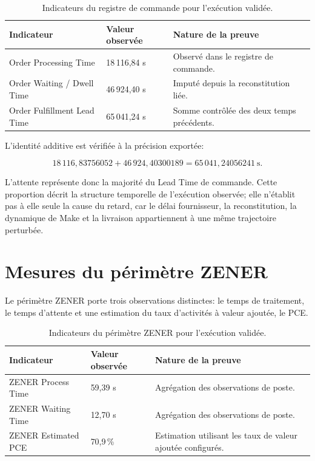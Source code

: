 \begin{table}[H]
  \centering
  \begin{tabularx}{\textwidth}{L{0.32\textwidth} L{0.20\textwidth} Y}
    \toprule
    Indicateur & Valeur observée & Nature de la preuve \\
    \midrule
    Order Processing Time & 18\,116,84 s & Observé dans le registre de commande. \\
    Order Waiting / Dwell Time & 46\,924,40 s & Imputé depuis la reconstitution liée. \\
    Order Fulfillment Lead Time & 65\,041,24 s & Somme contrôlée des deux temps précédents. \\
    \bottomrule
  \end{tabularx}
  \caption{Indicateurs du registre de commande pour l'exécution validée.}
  \label{tab:mesures-commande}
\end{table}

L'identité additive est vérifiée à la précision exportée:

\begin{equation}
18\,116{,}83756052 + 46\,924{,}40300189 = 65\,041{,}24056241\ \mathrm{s}.
\label{eq:identite-vsm-doc}
\end{equation}

L'attente représente donc la majorité du Lead Time de commande. Cette proportion décrit la structure temporelle de l'exécution observée; elle n'établit pas à elle seule la cause du retard, car le délai fournisseur, la reconstitution, la dynamique de Make et la livraison appartiennent à une même trajectoire perturbée.

\section{Mesures du périmètre ZENER}

Le périmètre ZENER porte trois observations distinctes: le temps de traitement, le temps d'attente et une estimation du taux d'activités à valeur ajoutée, le PCE.

\begin{table}[H]
  \centering
  \begin{tabularx}{\textwidth}{L{0.32\textwidth} L{0.20\textwidth} Y}
    \toprule
    Indicateur & Valeur observée & Nature de la preuve \\
    \midrule
    ZENER Process Time & 59,39 s & Agrégation des observations de poste. \\
    ZENER Waiting Time & 12,70 s & Agrégation des observations de poste. \\
    ZENER Estimated PCE & 70,9\,\% & Estimation utilisant les taux de valeur ajoutée configurés. \\
    \bottomrule
  \end{tabularx}
  \caption{Indicateurs du périmètre ZENER pour l'exécution validée.}
  \label{tab:mesures-zener}
\end{table}

